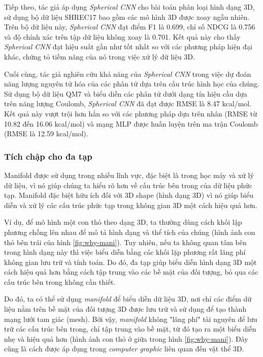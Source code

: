 Tiếp theo, tác giả áp dụng \textit{Spherical CNN} cho bài toán phân loại hình dạng 3D, sử dụng bộ dữ liệu SHREC17 bao gồm các mô hình 3D được xoay ngẫu nhiên. Trên bộ dữ liệu này, \textit{Spherical CNN} đạt điểm F1 là 0.699, chỉ số NDCG là 0.756 và độ chính xác trên tập dữ liệu không xoay là 0.701\cite{cohen2018sphericalcnns}. Kết quả này cho thấy \textit{Spherical CNN} đạt hiệu suất gần như tốt nhất so với các phương pháp hiện đại khác, chứng tỏ tiềm năng của nó trong việc xử lý dữ liệu 3D.

Cuối cùng, tác giả nghiên cứu khả năng của \textit{Spherical CNN} trong việc dự đoán năng lượng nguyên tử hóa của các phân tử dựa trên cấu trúc hình học của chúng. Sử dụng bộ dữ liệu QM7 và biểu diễn các phân tử dưới dạng tín hiệu cầu dựa trên năng lượng Coulomb, \textit{Spherical CNN} đã đạt được RMSE là 8.47 kcal/mol\cite{cohen2018sphericalcnns}. Kết quả này vượt trội hơn hẳn so với các phương pháp dựa trên nhân (RMSE từ 10.82 đến 16.06 kcal/mol) và mạng MLP được huấn luyện trên ma trận Coulomb (RMSE là 12.59 kcal/mol)\cite{cohen2018sphericalcnns}.

\subsubsection{Tích chập cho đa tạp}
Manifold được sử dụng trong nhiều lĩnh vực, đặc biệt là trong học máy và xử lý dữ liệu, vì nó giúp chúng ta hiểu rõ hơn về cấu trúc bên trong của dữ liệu phức tạp. Manifold đặc biệt hữu ích đối với 3D shape (hình dạng 3D) vì nó giúp biểu diễn và xử lý các cấu trúc phức tạp trong không gian 3D một cách hiệu quả hơn. 

Ví dụ, để mô hình một con thỏ theo dạng 3D, ta thường dùng cách khối lập phương chồng lên nhau để mô tả hình dạng và thể tích của chúng (hình ảnh con thỏ bên trái của hình \ref{fig:why-mani}). Tuy nhiên, nếu ta không quan tâm bên trong hình dạng này thì việc biểu diễn bằng các khối lặp phương rất lãng phí không gian lưu trữ và tính toán\cite{geometricdeep2022}. Do đó, đa tạp giúp biểu diễn hình dạng 3D một cách hiệu quả hơn bằng cách tập trung vào các bề mặt của đối tượng, bỏ qua các cấu trúc bên trong không cần thiết.

Do đó, ta có thể sử dụng \textit{manifold} để biểu diễn dữ liệu 3D, nơi chỉ các điểm dữ liệu nằm trên bề mặt của đối tượng 3D được lưu trữ và sử dụng để tạo thành mạng lưới tam giác (mesh). Bởi vậy, \textit{manifold} không "lãng phí" tài nguyên để lưu trữ các cấu trúc bên trong, chỉ tập trung vào bề mặt, từ đó tạo ra một biểu diễn nhẹ và hiệu quả hơn\cite{geometricdeep2022} (hình ảnh con thỏ ở giữa trong hình \ref{fig:why-mani}). Đây cũng là cách được áp dụng trong \textit{computer graphic} liên quan đến vật thể 3D.

